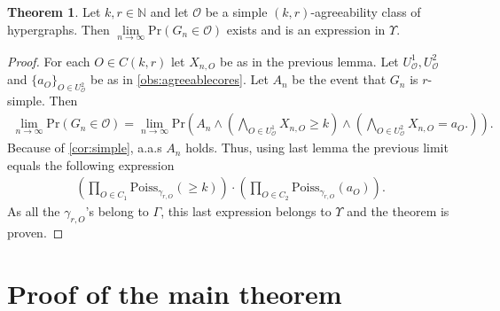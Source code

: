\documentclass[12pt,notitlepage,a4paper]{article}
\theoremstyle{definition}
\newtheorem{theorem}{Theorem}[section]
\newcommand{\N}{\mathbb{N}}
\newcommand{\Ln}{\lim\limits_{n\to \infty}}
\newcommand{\PR}[1]{\mathrm{Pr}\left(#1\right)}
\begin{document}
\begin{theorem}\label{thm:agreeabilityprobabilities}
	Let $k,r\in \N$ and let $\mathcal{O}$ be a simple $(k,r)$-agreeability class
	of hypergraphs. Then 
	$\Ln \PR{G_n\in \mathcal{O}}$ exists and is an expression
	in $\Upsilon$. 
\end{theorem}
\begin{proof}
For each $O\in C(k,r)$ let $X_{n,O}$ be as in the previous lemma. 
Let $U_\mathcal{O}^1, U_\mathcal{O}^2$ and $\{a_O\}_{O\in U^2_\mathcal{O}}$ 
be as in \cref{obs:agreeablecores}. Let $A_n$ be the event that $G_n$ is $r$-simple. 
Then
\begin{align*}
 \Ln
 \PR{G_n \in \mathcal{O}}=
 \Ln
 \mathrm{Pr} \left(
 A_n \wedge
 \left(
 \bigwedge_{O\in U_\mathcal{O}^1}
 X_{n,O}\geq k
 \right)
 \wedge
 \left(
 \bigwedge_{O\in  U^2_\mathcal{O}}
 X_{n,O}=a_O.
 \right)
 \right).
\end{align*}
Because of \cref{cor:simple}, a.a.s $A_n$ holds. Thus, using last
lemma the previous limit equals the following expression
\begin{align*}
\left(
\prod_{O\in C_1}
\mathrm{Poiss}_{\gamma_{r,O}}(\geq k)
\right)
\cdot
\left(
\prod_{O\in C_2}
\mathrm{Poiss}_{\gamma_{r,O}}(a_O)
\right)
.
\end{align*}
As all the $\gamma_{r,O}$'s belong to $\Gamma$,
this last expression belongs to $\Upsilon$ and the theorem is proven. 
\end{proof}

\section{Proof of the main theorem} \label{sect:main}
\end{document}
